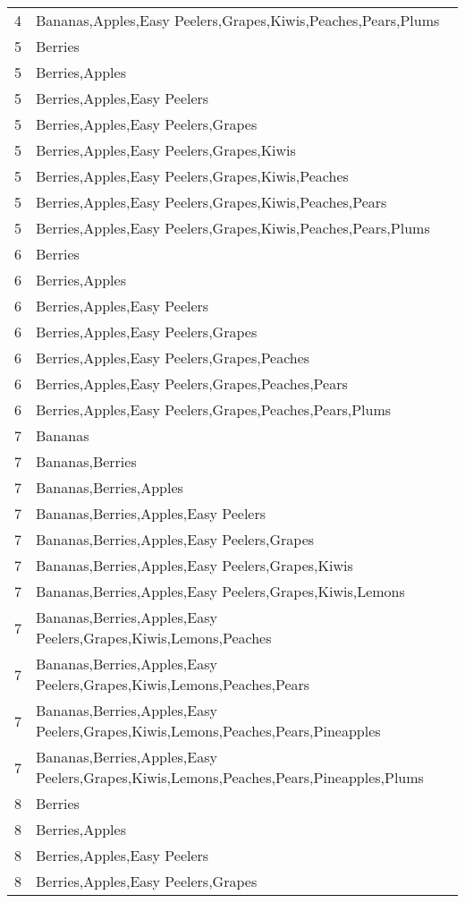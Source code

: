 \documentclass[11pt]{article}
\begin{document}
\begin{table}[h]
\begin{center}
\begin{tabular}{ll}
4 & Bananas,Apples,Easy Peelers,Grapes,Kiwis,Peaches,Pears,Plums \\
5 & Berries \\
5 & Berries,Apples \\
5 & Berries,Apples,Easy Peelers \\
5 & Berries,Apples,Easy Peelers,Grapes \\
5 & Berries,Apples,Easy Peelers,Grapes,Kiwis \\
5 & Berries,Apples,Easy Peelers,Grapes,Kiwis,Peaches \\
5 & Berries,Apples,Easy Peelers,Grapes,Kiwis,Peaches,Pears \\
5 & Berries,Apples,Easy Peelers,Grapes,Kiwis,Peaches,Pears,Plums \\
6 & Berries \\
6 & Berries,Apples \\
6 & Berries,Apples,Easy Peelers \\
6 & Berries,Apples,Easy Peelers,Grapes \\
6 & Berries,Apples,Easy Peelers,Grapes,Peaches \\
6 & Berries,Apples,Easy Peelers,Grapes,Peaches,Pears \\
6 & Berries,Apples,Easy Peelers,Grapes,Peaches,Pears,Plums \\
7 & Bananas \\
7 & Bananas,Berries \\
7 & Bananas,Berries,Apples \\
7 & Bananas,Berries,Apples,Easy Peelers \\
7 & Bananas,Berries,Apples,Easy Peelers,Grapes \\
7 & Bananas,Berries,Apples,Easy Peelers,Grapes,Kiwis \\
7 & Bananas,Berries,Apples,Easy Peelers,Grapes,Kiwis,Lemons \\
7 & Bananas,Berries,Apples,Easy Peelers,Grapes,Kiwis,Lemons,Peaches \\
7 & Bananas,Berries,Apples,Easy Peelers,Grapes,Kiwis,Lemons,Peaches,Pears \\
7 & Bananas,Berries,Apples,Easy Peelers,Grapes,Kiwis,Lemons,Peaches,Pears,Pineapples \\
7 & Bananas,Berries,Apples,Easy Peelers,Grapes,Kiwis,Lemons,Peaches,Pears,Pineapples,Plums \\
8 & Berries \\
8 & Berries,Apples \\
8 & Berries,Apples,Easy Peelers \\
8 & Berries,Apples,Easy Peelers,Grapes \\

\end{tabular}
\end{center}
\end{table}
\end{document}
